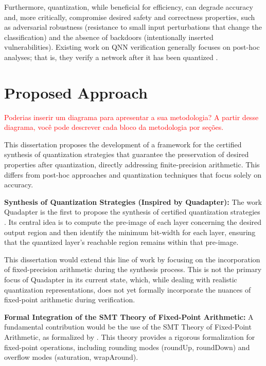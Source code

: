 Furthermore, quantization, while beneficial for efficiency, can degrade accuracy and, more critically, compromise desired safety and correctness properties, such as adversarial robustness (resistance to small input perturbations that change the classification) and the absence of backdoors (intentionally inserted vulnerabilities). Existing work on QNN verification generally focuses on post-hoc analyses; that is, they verify a network after it has been quantized \cite{abdi2021counterexample,Cai2020Certified}.

\section{Proposed Approach}

\textcolor{red}{Poderias inserir um diagrama para apresentar a sua metodologia? A partir desse diagrama, você pode descrever cada bloco da metodologia por seções.}

This dissertation proposes the development of a framework for the certified synthesis of quantization strategies that guarantee the preservation of desired properties after quantization, directly addressing finite-precision arithmetic. This differs from post-hoc approaches and quantization techniques that focus solely on accuracy.

\textbf{Synthesis of Quantization Strategies (Inspired by Quadapter):}
The work Quadapter is the first to propose the synthesis of certified quantization strategies \cite{Zhu2021Quadapter,Cai2020Certified}. Its central idea is to compute the pre-image of each layer concerning the desired output region and then identify the minimum bit-width for each layer, ensuring that the quantized layer's reachable region remains within that pre-image.

This dissertation would extend this line of work by focusing on the incorporation of fixed-precision arithmetic during the synthesis process. This is not the primary focus of Quadapter in its current state, which, while dealing with realistic quantization representations, does not yet formally incorporate the nuances of fixed-point arithmetic during verification.

\textbf{Formal Integration of the SMT Theory of Fixed-Point Arithmetic:}
A fundamental contribution would be the use of the SMT Theory of Fixed-Point Arithmetic, as formalized by \cite{baranowski2020smt}. This theory provides a rigorous formalization for fixed-point operations, including rounding modes (roundUp, roundDown) and overflow modes (saturation, wrapAround).

